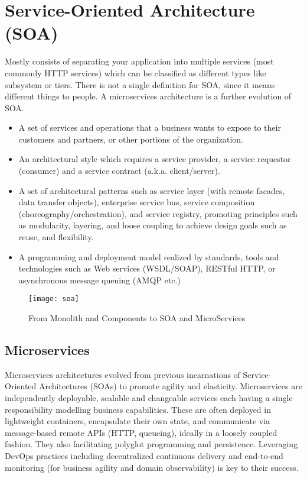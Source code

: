 \section{Service-Oriented Architecture (SOA)}
Mostly consists of separating your application into multiple services (most commonly HTTP services) which can be classified as different types like subsystem or tiers. There is not a single definition for SOA, since it means different things to people. A microservices architecture is a further evolution of SOA.

\begin{itemize}
  \item A set of services and operations that a business wants to expose to their customers and partners, or other portions of the organization.
  \item An architectural style which requires a service provider, a service requestor (consumer) and a service contract (a.k.a. client/server).
  \item  A set of architectural patterns such as service layer (with remote facades, data transfer objects), enterprise service bus, service composition (choreography/orchestration), and service registry, promoting principles such as modularity, layering, and loose coupling to achieve design goals such as reuse, and flexibility.
  \item  A programming and deployment model realized by standards, tools and technologies such as Web services (WSDL/SOAP), RESTful HTTP, or asynchronous message queuing (AMQP etc.)
\end{itemize}

\begin{figure}[H]
  \center
  \texttt{[image: soa]}
  \caption{From Monolith and Components to SOA and MicroServices}
\end{figure}

\subsection{Microservices}
Microservices architectures evolved from previous incarnations of Service-Oriented Architectures (SOAs) to promote agility and elasticity. Microservices are independently deployable, scalable and changeable services each having a single responsibility modelling business capabilities. These are often deployed in lightweight containers, encapsulate their own state, and communicate via message-based remote APIs (HTTP, queueing), ideally in a loosely coupled fashion. They also facilitating polyglot programming and persistence. Leveraging DevOps practices including decentralized continuous delivery and end-to-end monitoring (for business agility and domain observability) is key to their success.


